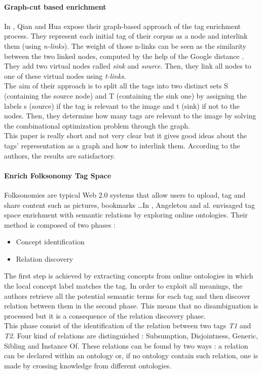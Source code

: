 \paragraph{Graph-cut based enrichment} %
\label{par:graph_cut_based_enrichment}
In \cite{qian}, Qian and Hua expose their graph-based approach of the tag enrichment process. They represent each initial tag of their corpus as a node and interlink them (using \emph{n-links}). The weight of those n-links can be seen as the similarity between the two linked nodes, computed by the help of the Google distance \cite{cili}. They add two virtual nodes called \emph{sink} and \emph{source}. Then, they link all nodes to one of these virtual nodes using \emph{t-links}.\\

The aim of their approach is to split all the tags into two distinct sets S (containing the source node) and T (containing the sink one) by assigning the labels s (source) if the tag is relevant to the image and t (sink) if not to the nodes. Then, they determine how many tags are relevant to the image by solving the combinational optimization problem through the graph.\\

This paper is really short and not very clear but it gives good ideas about the tags' representation as a graph and how to interlink them. According to the authors, the results are satisfactory.   

\paragraph{Enrich Folksonomy Tag Space} %
\label{par:enrich_folksonomy_tag_space}
Folksonomies are typical Web 2.0 systems that allow users to upload, tag and share content such as pictures, bookmarks \dots In \cite{angel}, Angeletou and al. envisaged tag space enrichment with semantic relations by exploring online ontologies. Their method is composed of two phases :
\begin{itemize}
	\item Concept identification 
	\item Relation discovery
\end{itemize}
The first step is achieved by extracting concepts from online ontologies in which the local concept label matches the tag. In order to exploit all meanings, the authors retrieve all the potential semantic terms for each tag and then discover relation between them in the second phase. This means that no disambiguation is processed but it is a consequence of the relation discovery phase.\\
This phase consist of the identification of the relation between two tags \emph{T1} and \emph{T2}. Four kind of relations are distinguished : Subsumption, Disjointness, Generic, Sibling and Instance Of. These relations can be found by two ways : a relation can be declared within an ontology or, if no ontology contain such relation, one is made by crossing knowledge from different ontologies.\\


